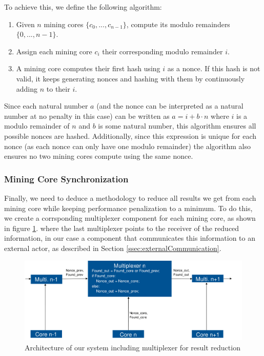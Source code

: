 To achieve this, we define the following algorithm:

\begin{enumerate}
	\item Given \(n\) mining cores \( \{c_0, ... , c_{n-1}\} \), compute its modulo remainders \( \{0, ... , n-1\} \).
	\item Assign each mining core $c_i$ their corresponding modulo remainder $i$.
	\item A mining core computes their first hash using $i$ as a nonce. If this hash is not valid, it keeps generating nonces and hashing with them by continuously adding $n$ to their $i$.
\end{enumerate}

Since each natural number $a$ (and the nonce can be interpreted as a natural number at no penalty in this case) can be written as \( a = i + b \cdot n \) where $i$ is a modulo remainder of $n$ and $b$ is some natural number, this algorithm ensures all possible nonces are hashed. Additionally, since this expression is unique for each nonce (as each nonce can only have one modulo remainder) the algorithm also ensures no two mining cores compute using the same nonce.


\subsubsection{Mining Core Synchronization}


Finally, we need to deduce a methodology to reduce all results we get from each mining core while keeping performance penalization to a minimum. To do this, we create a corrsponding multiplexer component for each mining core, as shown in figure \ref{fig:multiplexer}.
where the last multiplexer points to the receiver of the reduced information, in our case a component that communicates this information to an external actor, as described in Section \ref{ssec:externalCommunication}. 

\begin{figure}
	\centering
	\includegraphics[width=\textwidth]{img/multiplexer.png}
	\caption[Architecture of our system including multiplexer for result reduction]{Architecture of our system including multiplexer for result reduction}
	\label{fig:multiplexer}
\end{figure}

